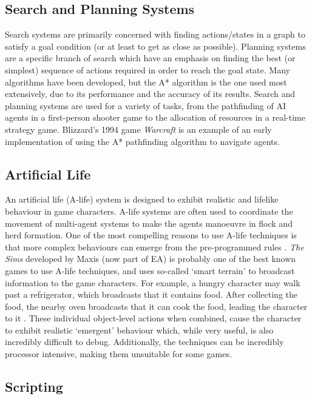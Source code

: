 \documentclass[a4paper,oneside]{report}
\begin{document}
\subsection{Search and Planning Systems} 

Search systems are primarily concerned with finding actions/states in a graph to satisfy a goal condition (or at least to get as close as possible). Planning systems are a specific branch of search which have an emphasis on finding the best (or simplest) sequence of actions required in order to reach the goal state. Many algorithms have been developed, but the A* algorithm is the one used most extensively, due to its performance and the accuracy of its results. Search and planning systems are used for a variety of tasks, from the pathfinding of AI agents in a first-person shooter game to the allocation of resources in a real-time strategy game. Blizzard's 1994 game \emph{Warcraft} is an example of an early implementation of using the A* pathfinding algorithm to navigate agents.

\subsection{Artificial Life} 

An artificial life (A-life) system is designed to exhibit realistic and lifelike behaviour in game characters. A-life systems are often used to coordinate the movement of multi-agent systems to make the agents manoeuvre in flock and herd formation. One of the most compelling reasons to use A-life techniques is that more complex behaviours can emerge from the pre-programmed rules \cite{Woodcock:bs}. \emph{The Sims} developed by Maxis (now part of EA) is probably one of the best known games to use A-life techniques, and uses so-called `smart terrain' to broadcast information to the game characters. For example, a hungry character may walk past a refrigerator, which broadcasts that it contains food. After collecting the food, the nearby oven broadcasts that it can cook the food, leading the character to it \cite{Woodcock:bs}. These individual object-level actions when combined, cause the character to exhibit realistic `emergent' behaviour which, while very useful, is also incredibly difficult to debug. Additionally, the techniques can be incredibly processor intensive, making them unsuitable for some games. 

\subsection{Scripting} 
\end{document}
